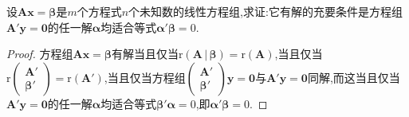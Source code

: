 \documentclass[../../main.tex]{subfiles}%
\begin{document}
\begin{example}
设\(\boldsymbol{A}\boldsymbol{x}=\boldsymbol{\beta}\)是\(m\)个方程式\(n\)个未知数的线性方程组,求证:它有解的充要条件是方程组\(\boldsymbol{A}'\boldsymbol{y}=\boldsymbol{0}\)的任一解\(\boldsymbol{\alpha}\)均适合等式\(\boldsymbol{\alpha}'\boldsymbol{\beta}=0\).
\end{example}
\begin{proof}

方程组\(\boldsymbol{A}\boldsymbol{x}=\boldsymbol{\beta}\)有解当且仅当\(\mathrm{r}\left( \boldsymbol{A}\,|\,\boldsymbol{\beta } \right) =\mathrm{r}(\boldsymbol{A})\),当且仅当\(\mathrm{r}\begin{pmatrix}
\boldsymbol{A}'\\
\boldsymbol{\beta}'
\end{pmatrix}=\mathrm{r}(\boldsymbol{A}')\),当且仅当方程组\(\begin{pmatrix}
\boldsymbol{A}'\\
\boldsymbol{\beta}'
\end{pmatrix}\boldsymbol{y}=\boldsymbol{0}\)与\(\boldsymbol{A}'\boldsymbol{y}=\boldsymbol{0}\)同解,而这当且仅当\(\boldsymbol{A}'\boldsymbol{y}=\boldsymbol{0}\)的任一解\(\boldsymbol{\alpha}\)均适合等式\(\boldsymbol{\beta}'\boldsymbol{\alpha}=0\),即\(\boldsymbol{\alpha}'\boldsymbol{\beta}=0\).

\end{proof}
\end{document}
